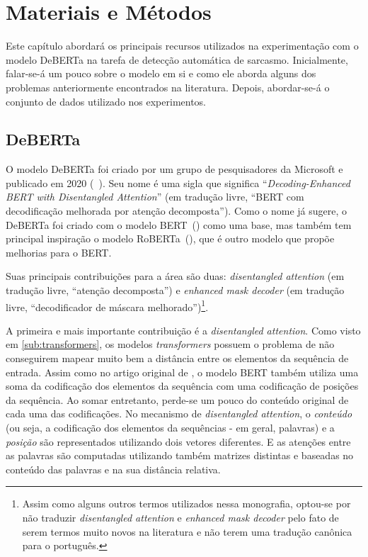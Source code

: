 

\chapter{Materiais e Métodos}%
\label{cha:materiais_e_metodos}

Este capítulo abordará os principais recursos utilizados na experimentação com o
modelo DeBERTa na tarefa de detecção automática de sarcasmo. Inicialmente,
falar-se-á um pouco sobre o modelo em si e como ele aborda alguns dos problemas
anteriormente encontrados na literatura. Depois, abordar-se-á o conjunto de
dados utilizado nos experimentos.

\section{DeBERTa}%
\label{sec:deberta}

O modelo DeBERTa foi criado por um grupo de pesquisadores da Microsoft e
publicado em 2020 (~\cite{he-etal:2020:deberta}). Seu nome é uma sigla que
significa ``\textit{Decoding-Enhanced BERT with Disentangled Attention}'' (em
tradução livre, ``BERT com decodificação melhorada por atenção decomposta'').
Como o nome já sugere, o DeBERTa foi criado com o modelo
BERT~(\cite{devlin-etal:2018:bert}) como uma base, mas também tem principal
inspiração o modelo RoBERTa~(\cite{liu-etal:2019:roberta}), que é outro modelo
que propõe melhorias para o BERT.

Suas principais contribuições para a área são duas: \textit{disentangled
attention} (em tradução livre, ``atenção decomposta'') e \textit{enhanced mask
decoder} (em tradução livre, ``decodificador de máscara
melhorado'')\footnote{Assim como alguns outros termos utilizados nessa
monografia, optou-se por não traduzir \textit{disentangled attention}
e \textit{enhanced mask decoder} pelo fato de serem termos muito novos na
literatura e não terem uma tradução canônica para o português.}.

A primeira e mais importante contribuição é a \textit{disentangled attention}.
Como visto em \ref{sub:transformers}, os modelos \textit{transformers} possuem
o problema de não conseguirem mapear muito bem a distância entre os elementos da
sequência de entrada. Assim como no artigo original de
\cite{vaswani-etal:2017:attention-is-all-you-need}, o modelo BERT também utiliza
uma soma da codificação dos elementos da sequência com uma codificação de
posições da sequência. Ao somar entretanto, perde-se um pouco do conteúdo
original de cada uma das codificações. No mecanismo de \textit{disentangled
attention}, o \textit{conteúdo} (ou seja, a codificação dos elementos da
sequências - em geral, palavras) e a \textit{posição} são representados
utilizando dois vetores diferentes. E as atenções entre as palavras são
computadas utilizando também matrizes distintas e baseadas no conteúdo das
palavras e na sua distância relativa.

